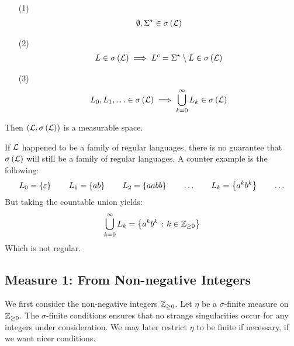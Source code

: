 \documentclass[12pt]{article}
\begin{document}
\begin{enumerate}
  \item[(1)]
    \begin{align*}
      \emptyset, \Sigma^\star \in \sigma\left(\mathcal{L}\right)
    \end{align*}

  \item[(2)]
    \begin{align*}
      L \in \sigma\left(\mathcal{L}\right)
        \implies
          L^c = \Sigma^\star \setminus L \in \sigma\left(\mathcal{L}\right)
    \end{align*}

  \item[(3)]
    \begin{align*}
      L_0, L_1, \ldots \in \sigma\left(\mathcal{L}\right)
        \implies
          \bigcup_{k = 0}^{\infty} L_k \in \sigma\left(\mathcal{L}\right)
    \end{align*}

\end{enumerate}

Then \(\left(\mathcal{L}, \sigma\left(\mathcal{L}\right)\right)\) is a measurable space.

\begin{remark}
If \(\mathcal{L}\) happened to be a family of regular languages,
there is no guarantee that \(\sigma\left(\mathcal{L}\right)\)
will still be a family of regular languages.
A counter example is the following:
\begin{align*}
  L_0 = \left\{\varepsilon\right\}
  \qquad
  L_1 = \left\{ab\right\}
  \qquad
  L_2 = \left\{aabb\right\}
  \qquad
  \ldots
  \qquad
  L_k = \left\{a^k b^k\right\}
  \qquad
  \ldots
\end{align*}
But taking the countable union yields:
\begin{align*}
  \bigcup_{k = 0}^{\infty} L_k = \left\{a^k b^k \ \colon k \in \mathbb{Z}_{\geq 0}\right\}
\end{align*}
Which is not regular.
\end{remark}


\subsection{Measure 1: From Non-negative Integers}
We first consider the non-negative integers \(\mathbb{Z}_{\geq 0}\).
Let \(\eta\) be a \(\sigma\)-finite measure on \(\mathbb{Z}_{\geq 0}\).
The \(\sigma\)-finite conditions ensures that no strange singularities
occur for any integers under consideration.
We may later restrict \(\eta\) to be finite if necessary,
if we want nicer conditions.
\end{document}
